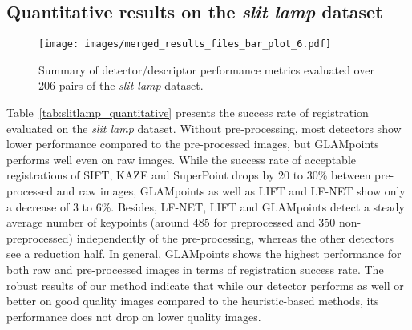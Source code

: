 \subsection{Quantitative results on the \textbf{\textit{slit lamp}} dataset}

\begin{figure*}
    \centering
    \texttt{[image: images/merged\_results\_files\_bar\_plot\_6.pdf]}
    \caption{Summary of detector/descriptor performance metrics evaluated over 206 pairs of the \textit{slit lamp} dataset.}
    \label{results-slitlamp}
\end{figure*}


Table~\ref{tab:slitlamp_quantitative} presents the success rate of registration evaluated on the \textit{slit lamp} dataset. Without pre-processing, most detectors show lower performance compared to the pre-processed images, but GLAMpoints performs well even on raw images. While the success rate of acceptable registrations of \ac{SIFT}, KAZE and SuperPoint drops by 20 to 30\% between pre-processed and raw images, \ac{GLAMpoints} as well as \ac{LIFT} and \ac{LF-NET} show only a decrease of 3 to 6\%. Besides, \ac{LF-NET}, \ac{LIFT} and \ac{GLAMpoints} detect a steady average number of keypoints (around 485 for preprocessed and 350 non-preprocessed) independently of the pre-processing, whereas the other detectors see a reduction half. In general, GLAMpoints shows the highest performance for both raw and pre-processed images in terms of registration success rate. The robust results of our method indicate that while our detector performs as well or better on good quality images compared to the heuristic-based methods, its performance does not drop on lower quality images.


